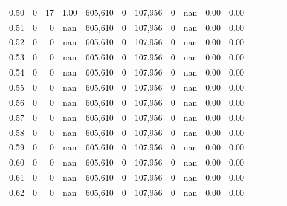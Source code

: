 \begin{tabular}{rrrcrrrrrrrrrrr}
0.50 &       0 &     17 &                                       1.00 &  605,610 &        0 &  107,956 &        0 &   nan &  0.00 &                         0.00 \\
0.51 &       0 &      0 &                                        nan &  605,610 &        0 &  107,956 &        0 &   nan &  0.00 &                         0.00 \\
0.52 &       0 &      0 &                                        nan &  605,610 &        0 &  107,956 &        0 &   nan &  0.00 &                         0.00 \\
0.53 &       0 &      0 &                                        nan &  605,610 &        0 &  107,956 &        0 &   nan &  0.00 &                         0.00 \\
0.54 &       0 &      0 &                                        nan &  605,610 &        0 &  107,956 &        0 &   nan &  0.00 &                         0.00 \\
0.55 &       0 &      0 &                                        nan &  605,610 &        0 &  107,956 &        0 &   nan &  0.00 &                         0.00 \\
0.56 &       0 &      0 &                                        nan &  605,610 &        0 &  107,956 &        0 &   nan &  0.00 &                         0.00 \\
0.57 &       0 &      0 &                                        nan &  605,610 &        0 &  107,956 &        0 &   nan &  0.00 &                         0.00 \\
0.58 &       0 &      0 &                                        nan &  605,610 &        0 &  107,956 &        0 &   nan &  0.00 &                         0.00 \\
0.59 &       0 &      0 &                                        nan &  605,610 &        0 &  107,956 &        0 &   nan &  0.00 &                         0.00 \\
0.60 &       0 &      0 &                                        nan &  605,610 &        0 &  107,956 &        0 &   nan &  0.00 &                         0.00 \\
0.61 &       0 &      0 &                                        nan &  605,610 &        0 &  107,956 &        0 &   nan &  0.00 &                         0.00 \\
0.62 &       0 &      0 &                                        nan &  605,610 &        0 &  107,956 &        0 &   nan &  0.00 &                         0.00 \\

\end{tabular}
